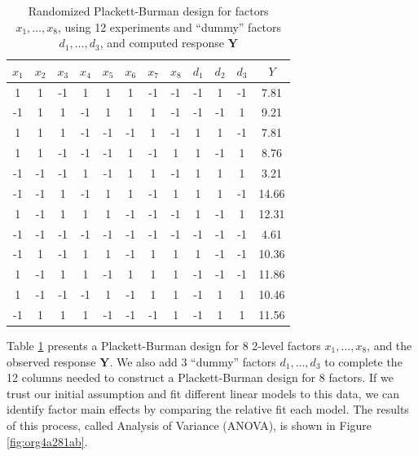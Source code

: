 \documentclass[conference]{IEEEtran}
\begin{document}
\begin{table}[ht]
\centering
\caption{Randomized Plackett-Burman design for factors $x_1, \dots, x_8$, using 12 experiments and ``dummy'' factors $d_1, \dots, d_3$, and computed response $\mathbf{Y}$}
\label{tab:plackett}
\begingroup\scriptsize
\begin{tabular}{cccccccccccc}
  \toprule
$x_1$ & $x_2$ & $x_3$ & $x_4$ & $x_5$ & $x_6$ & $x_7$ & $x_8$ & $d_1$ & $d_2$ & $d_3$ & $Y$ \\
  \midrule
1 & 1 & -1 & 1 & 1 & 1 & -1 & -1 & -1 & 1 & -1 & 7.81 \\
  -1 & 1 & 1 & -1 & 1 & 1 & 1 & -1 & -1 & -1 & 1 & 9.21 \\
  1 & 1 & 1 & -1 & -1 & -1 & 1 & -1 & 1 & 1 & -1 & 7.81 \\
  1 & 1 & -1 & -1 & -1 & 1 & -1 & 1 & 1 & -1 & 1 & 8.76 \\
  -1 & -1 & -1 & 1 & -1 & 1 & 1 & -1 & 1 & 1 & 1 & 3.21 \\
  -1 & -1 & 1 & -1 & 1 & 1 & -1 & 1 & 1 & 1 & -1 & 14.66 \\
  1 & -1 & 1 & 1 & 1 & -1 & -1 & -1 & 1 & -1 & 1 & 12.31 \\
  -1 & -1 & -1 & -1 & -1 & -1 & -1 & -1 & -1 & -1 & -1 & 4.61 \\
  -1 & 1 & -1 & 1 & 1 & -1 & 1 & 1 & 1 & -1 & -1 & 10.36 \\
  1 & -1 & 1 & 1 & -1 & 1 & 1 & 1 & -1 & -1 & -1 & 11.86 \\
  1 & -1 & -1 & -1 & 1 & -1 & 1 & 1 & -1 & 1 & 1 & 10.46 \\
  -1 & 1 & 1 & 1 & -1 & -1 & -1 & 1 & -1 & 1 & 1 & 11.56 \\
   \bottomrule
\end{tabular}
\endgroup
\end{table}

Table \ref{tab:plackett} presents a Plackett-Burman design for 8 2-level factors
\(x_1,\dots,x_8\), and the observed response \(\mathbf{Y}\). We also add 3 ``dummy''
factors \(d_1,\dots,d_3\) to complete the 12 columns needed to construct a
Plackett-Burman design for 8 factors. If we trust our initial assumption and fit
different linear models to this data, we can identify factor main effects by
comparing the relative fit each model. The results of this process, called
Analysis of Variance (ANOVA), is shown in Figure \ref{fig:org4a281ab}.
\end{document}
